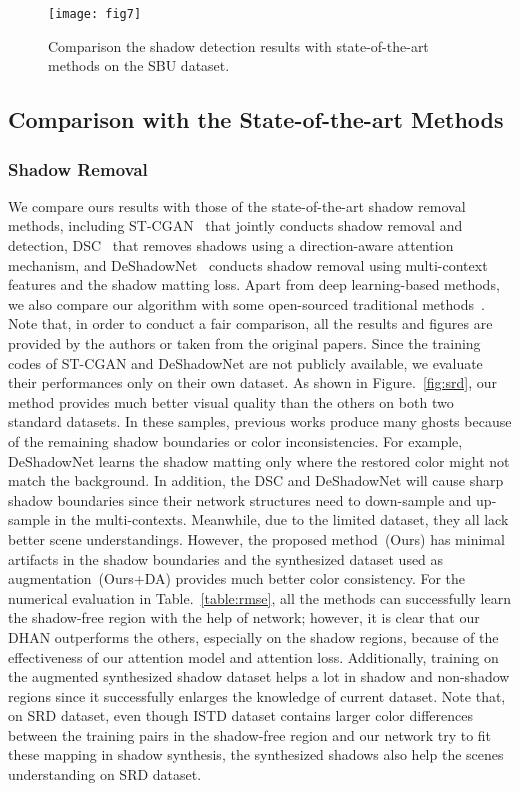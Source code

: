 \documentclass[letterpaper]{article} \usepackage{aaai20}  \usepackage{times}  \usepackage{helvet} \usepackage{courier}  \usepackage[hyphens]{url}  \urlstyle{rm} \def\UrlFont{\rm}  \usepackage{graphicx}  \frenchspacing  \setlength{\pdfpagewidth}{8.5in}  \setlength{\pdfpageheight}{11in}  \usepackage{amssymb}
\begin{document}
\begin{figure*}[t]
\centering     \texttt{[image: fig7]}
\caption{Comparison the shadow detection results with state-of-the-art methods on the SBU dataset.}
\label{fig:sbu}
\end{figure*}

\subsection{Comparison with the State-of-the-art Methods}
\subsubsection{Shadow Removal}
We compare ours results with those of the state-of-the-art shadow removal methods, including ST-CGAN~\cite{wang2018stacked} that jointly conducts shadow removal and detection, DSC~\cite{Hu:2018wd} that removes shadows using a direction-aware attention mechanism, and DeShadowNet~\cite{qu2017deshadownet} conducts shadow removal using multi-context features and the shadow matting loss. Apart from deep learning-based methods, we also compare our algorithm with some open-sourced traditional methods~\cite{Guo:2013tt,gong2014interactive,yang2012shadow}. Note that, in order to conduct a fair comparison, all the results and figures are provided by the authors or taken from the original papers. Since the training codes of ST-CGAN and DeShadowNet are not publicly available, we evaluate their performances only on their own dataset. As shown in Figure.~\ref{fig:srd}, our method provides much better visual quality than the others on both two standard datasets. In these samples, previous works produce many ghosts because of the remaining shadow boundaries or color inconsistencies. For example, DeShadowNet learns the shadow matting only where the restored color might not match the background. In addition, the DSC and DeShadowNet will cause sharp shadow boundaries since their network structures need to down-sample and up-sample in the multi-contexts. Meanwhile, due to the limited dataset, they all lack better scene understandings. However, the proposed method~(Ours) has minimal artifacts in the shadow boundaries and the synthesized dataset used as augmentation~(Ours+DA) provides much better color consistency. For the numerical evaluation in Table.~\ref{table:rmse}, all the methods can successfully learn the shadow-free region with the help of network; however, it is clear that our DHAN outperforms the others, especially on the shadow regions, because of the effectiveness of our attention model and attention loss. Additionally, training on the augmented synthesized shadow dataset helps a lot in shadow and non-shadow regions since it successfully enlarges the knowledge of current dataset. Note that, on SRD dataset,
even though ISTD dataset contains larger color differences between the training pairs in the shadow-free region and our network try to fit these mapping in shadow synthesis, the synthesized shadows also help the scenes understanding on SRD dataset. 
\end{document}
